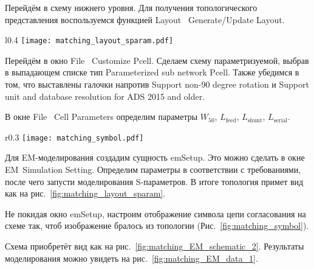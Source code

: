 Перейдём в схему нижнего уровня. Для получения топологического представления воспользуемся функцией Layout \textrightarrow\ Generate/Update Layout.

\begin{wrapfigure}{l}{0.4\textwidth}
    \centering
    \texttt{[image: matching\_layout\_sparam.pdf]}
    \caption{Топологическое представление после моделирования S-параметров}%
    \label{fig:matching_layout_sparam}
\end{wrapfigure}

\begin{comment}
Топологическое представление создано верно (Рис.~\ref{fig:matching_layout_check}).

\begin{wrapfigure}{r}{0.4\textwidth}
    \centering
    \texttt{[image: matching\_layout\_check.pdf]}
    \caption{Проверка топологического представления}%
    \label{fig:matching_layout_check}
\end{wrapfigure}
\end{comment}

Перейдём в окно File \textrightarrow\ Customize Pcell.
Сделаем схему параметризуемой, выбрав в выпадающем списке тип Parameterized sub network Pcell.
Также убедимся в том, что выставлены галочки напротив Support non-90 degree rotation и Support unit and database resolution for ADS 2015 and older.

В окне File \textrightarrow\ Cell Parameters определим параметры $W_{50}$, $L_\text{feed}$, $L_\text{shunt}$, $L_\text{serial}$.

\begin{wrapfigure}{r}{0.3\textwidth}
    \centering
    \texttt{[image: matching\_symbol.pdf]}
    \caption{Обновлённый символ}%
    \label{fig:matching_symbol}
\end{wrapfigure}

Для EM-моделирования создадим сущность emSetup.
Это можно сделать в окне EM\textrightarrow\ Simulation Setting.
Определим параметры в соответствии с требованиями, после чего запусти моделирования S-параметров.
В итоге топология примет вид как на рис.~\ref{fig:matching_layout_sparam}.

Не покидая окно emSetup, настроим отображение символа цепи согласования на схеме так, чтоб изображение бралось из топологии (Рис.~\ref{fig:matching_symbol}).

Схема приобретёт вид как на рис.~\ref{fig:matching_EM_schematic_2}. Результаты моделирования можно увидеть на рис.~\ref{fig:matching_EM_data_1}.

